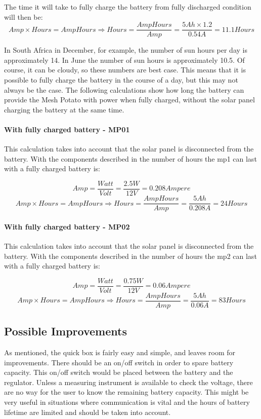 The time it will take to fully charge the battery from fully discharged condition will then be: 
$$Amp\times Hours = AmpHours \Rightarrow Hours =\frac{AmpHours}{Amp} = \frac{5 Ah\times 1.2}{0.54A} = 11.1 Hours$$

In South Africa in December, for example, the number of sun hours per day is approximately 14. In June the number of sun hours is approximately 10.5. Of course, it can be cloudy, so these numbers are best case. This means that it is possible to fully charge the battery in the course of a day, but this may not always be the case. The following calculations show how long the battery can provide the Mesh Potato with power when fully charged, without the solar panel charging the battery at the same time. 

\paragraph{With fully charged battery - MP01}
This calculation takes into account that the solar panel is disconnected from the battery. With the components described in  the number of hours the \gls{mp1} can last with a fully charged battery is: 

$$Amp = \frac{Watt}{Volt} = \frac{2.5 W}{12 V} = 0.208 Ampere$$
$$Amp\times Hours = AmpHours \Rightarrow Hours = \frac{AmpHours}{Amp} = \frac{5 Ah}{0.208 A} = 24 Hours$$

\paragraph{With fully charged battery - MP02}
This calculation takes into account that the solar panel is disconnected from the battery. With the components described in  the number of hours the \gls{mp2} can last with a fully charged battery is: 

$$Amp = \frac{Watt}{Volt} = \frac{0.75 W}{12 V} = 0.06 Ampere$$
$$Amp\times Hours = AmpHours \Rightarrow Hours = \frac{AmpHours}{Amp} = \frac{5 Ah}{0.06 A} = 83 Hours$$


\subsection{Possible Improvements}
As mentioned, the \gls {quick} box is fairly easy and simple, and leaves room for improvements. There should be an on/off switch in order to spare battery capacity. This on/off switch would be placed between the battery and the regulator. Unless a measuring instrument is available to check the voltage, there are no way for the user to know the remaining battery capacity. This might be very useful in situations where communication is vital and the hours of battery lifetime are limited and should be taken into account. 

